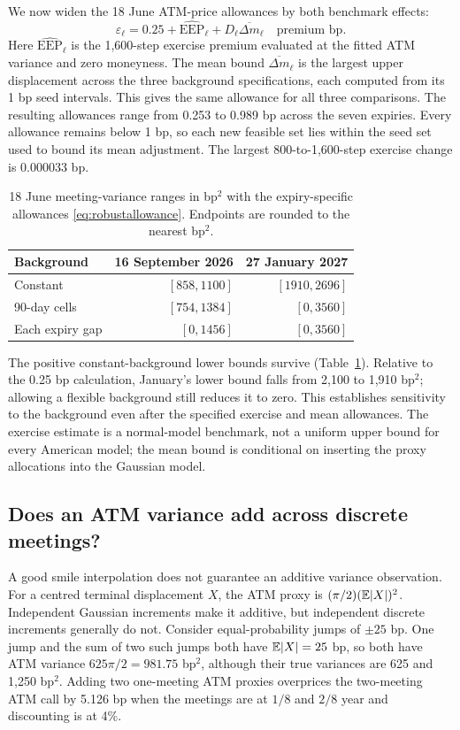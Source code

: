 We now widen the 18 June ATM-price allowances by both benchmark effects:
\begin{equation}\label{eq:robustallowance}
\varepsilon_\ell=0.25+\widehat{\mathrm{EEP}}_\ell
                         +D_\ell\overline{\Delta m}_\ell\quad\text{premium bp}.
\end{equation}
Here $\widehat{\mathrm{EEP}}_\ell$ is the 1,600-step exercise premium evaluated at the fitted ATM variance and zero moneyness. The mean bound $\overline{\Delta m}_\ell$ is the largest upper displacement across the three background specifications, each computed from its 1 bp seed intervals. This gives the same allowance for all three comparisons. The resulting allowances range from 0.253 to 0.989 bp across the seven expiries. Every allowance remains below 1 bp, so each new feasible set lies within the seed set used to bound its mean adjustment. The largest 800-to-1,600-step exercise change is 0.000033 bp.

\begin{table}[ht]
\centering\small
\begin{tabular}{lrr}
\toprule
Background & 16 September 2026 & 27 January 2027\\
\midrule
Constant & $[858,1100]$ & $[1910,2696]$\\
90-day cells & $[754,1384]$ & $[0,3560]$\\
Each expiry gap & $[0,1456]$ & $[0,3560]$\\
\bottomrule
\end{tabular}
\caption{18 June meeting-variance ranges in bp$^2$ with the expiry-specific allowances \eqref{eq:robustallowance}. Endpoints are rounded to the nearest bp$^2$.}\label{tab:robustranges}
\end{table}

The positive constant-background lower bounds survive (Table~\ref{tab:robustranges}). Relative to the 0.25 bp calculation, January's lower bound falls from 2,100 to 1,910 bp$^2$; allowing a flexible background still reduces it to zero. This establishes sensitivity to the background even after the specified exercise and mean allowances. The exercise estimate is a normal-model benchmark, not a uniform upper bound for every American model; the mean bound is conditional on inserting the proxy allocations into the Gaussian model.

\subsection{Does an ATM variance add across discrete meetings?}\label{sec:additivity}
A good smile interpolation does not guarantee an additive variance observation. For a centred terminal displacement $X$, the ATM proxy is $(\pi/2)(\mathbb E|X|)^2$. Independent Gaussian increments make it additive, but independent discrete increments generally do not. Consider equal-probability jumps of $\pm25$ bp. One jump and the sum of two such jumps both have $\mathbb E|X|=25$ bp, so both have ATM variance $625\pi/2=981.75$ bp$^2$, although their true variances are 625 and 1,250 bp$^2$. Adding two one-meeting ATM proxies overprices the two-meeting ATM call by 5.126 bp when the meetings are at $1/8$ and $2/8$ year and discounting is at 4\%.


